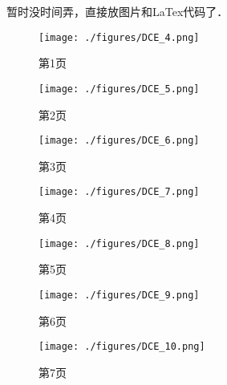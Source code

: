 
\begin{issues}
\issueTODO
\end{issues}

暂时没时间弄，直接放图片和LaTex代码了．
\begin{figure}[ht]
\centering
\texttt{[image: ./figures/DCE\_4.png]}
\caption{第1页} \label{DCE_fig4}
\end{figure}
\begin{figure}[ht]
\centering
\texttt{[image: ./figures/DCE\_5.png]}
\caption{第2页} \label{DCE_fig5}
\end{figure}
\begin{figure}[ht]
\centering
\texttt{[image: ./figures/DCE\_6.png]}
\caption{第3页} \label{DCE_fig6}
\end{figure}
\begin{figure}[ht]
\centering
\texttt{[image: ./figures/DCE\_7.png]}
\caption{第4页} \label{DCE_fig7}
\end{figure}
\begin{figure}[ht]
\centering
\texttt{[image: ./figures/DCE\_8.png]}
\caption{第5页} \label{DCE_fig8}
\end{figure}
\begin{figure}[ht]
\centering
\texttt{[image: ./figures/DCE\_9.png]}
\caption{第6页} \label{DCE_fig9}
\end{figure}
\begin{figure}[ht]
\centering
\texttt{[image: ./figures/DCE\_10.png]}
\caption{第7页} \label{DCE_fig10}
\end{figure}
